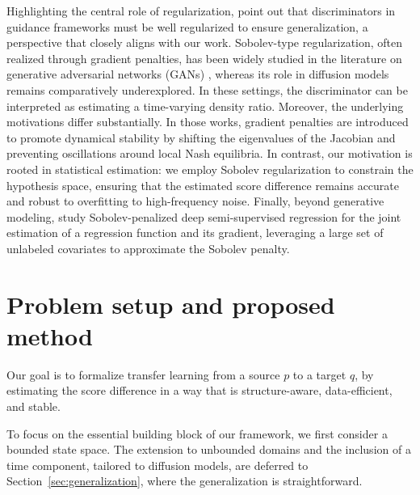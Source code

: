 \documentclass[11pt]{article}
\theoremstyle{plain}
\theoremstyle{definition}
\theoremstyle{remark}
\begin{document}
Highlighting the central role of  regularization, \cite{husaingeneralization} point out that discriminators in guidance frameworks must be well regularized to ensure generalization, a perspective that closely aligns with our work. Sobolev-type regularization, often realized through gradient penalties, has been widely studied in the literature on generative adversarial networks (GANs) \cite{lin2025diffusion, roth2017stabilizing, mescheder2018training}, whereas its role in diffusion models remains comparatively underexplored.  In these settings, the discriminator can be interpreted as estimating a time-varying density ratio. Moreover, the underlying motivations differ substantially. In those works, gradient penalties are introduced to promote dynamical stability by shifting the eigenvalues of the Jacobian and preventing oscillations around local Nash equilibria. In contrast, our motivation is rooted in statistical estimation: we employ Sobolev regularization to constrain the hypothesis space, ensuring that the estimated score difference remains accurate and robust to overfitting to high-frequency noise. Finally, beyond generative modeling, \cite{ding2025semi} study Sobolev-penalized deep semi-supervised regression for the joint estimation of a regression function and its gradient, leveraging a large set of unlabeled covariates to approximate the Sobolev penalty.

\section{Problem setup and proposed method}
\label{sec:setup-OU-tilde}
Our goal is to formalize transfer learning from a source   $p$ to a target
$q$, by estimating the score difference in a way that is structure-aware, data-efficient, and stable.


To focus on the essential building block of our framework, we first consider a bounded state space. The extension to unbounded domains and the inclusion of a time component, tailored to diffusion models, are deferred to Section~\ref{sec:generalization}, where the generalization is straightforward.
\end{document}
